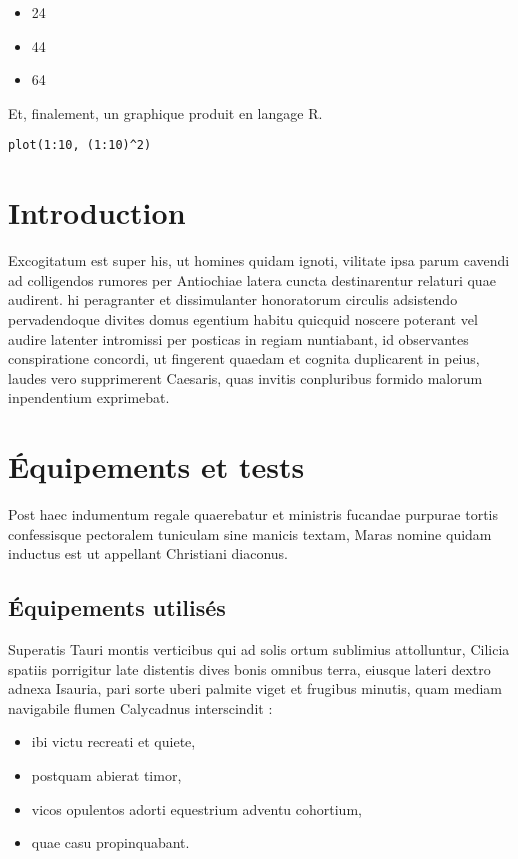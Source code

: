 \documentclass[french]{report}
\begin{document}
\begin{itemize}
\item 24
\item 44
\item 64
\end{itemize}

Et, finalement, un graphique produit en langage R.

\lstset{language=r,label= ,caption= ,captionpos=b,numbers=none}
\begin{lstlisting}
plot(1:10, (1:10)^2)
\end{lstlisting}

\part{Introduction}
\label{sec:org23aae3b}

Excogitatum est super his, ut homines quidam ignoti, vilitate ipsa parum cavendi
ad colligendos rumores per Antiochiae latera cuncta destinarentur relaturi quae
audirent. hi peragranter et dissimulanter honoratorum circulis adsistendo
pervadendoque divites domus egentium habitu quicquid noscere poterant vel audire
latenter intromissi per posticas in regiam nuntiabant, id observantes
conspiratione concordi, ut fingerent quaedam et cognita duplicarent in peius,
laudes vero supprimerent Caesaris, quas invitis conpluribus formido malorum
inpendentium exprimebat.

\part{Équipements et tests}
\label{sec:org5aa9652}

Post haec indumentum regale quaerebatur et ministris fucandae purpurae tortis
confessisque pectoralem tuniculam sine manicis textam, Maras nomine quidam
inductus est ut appellant Christiani diaconus.

\chapter{Équipements utilisés}
\label{sec:org1a3b1a1}

Superatis Tauri montis verticibus qui ad solis ortum sublimius attolluntur,
Cilicia spatiis porrigitur late distentis dives bonis omnibus terra, eiusque
lateri dextro adnexa Isauria, pari sorte uberi palmite viget et frugibus
minutis, quam mediam navigabile flumen Calycadnus interscindit :

\begin{itemize}
\item ibi victu recreati et quiete,
\item postquam abierat timor,
\item vicos opulentos adorti equestrium adventu cohortium,
\item quae casu propinquabant.
\end{itemize}
\end{document}
